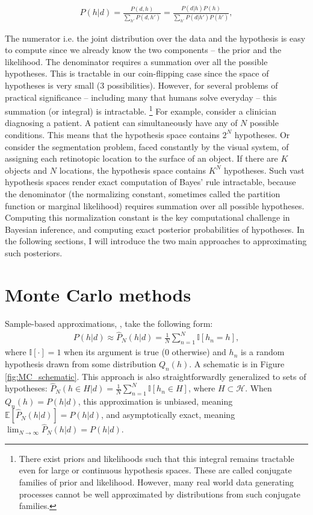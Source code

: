 \begin{align}
    P(h|d) = \frac{P(d, h)}{\sum_{h'} P(d, h')} = \frac{P(d|h)P(h)}{\sum_{h'} P(d|h') P(h')},
\end{align}

The numerator i.e. the joint distribution over the data and the hypothesis is easy to compute since we already know the two components -- the prior and the likelihood. The denominator requires a summation over all the possible hypotheses. This is tractable in our coin-flipping case since the space of hypotheses is very small (3 possibilities). However, for several problems of practical significance -- including many that humans solve everyday -- this summation (or integral) is intractable. \footnote{There exist priors and likelihoods such that this integral remains tractable even for large or continuous hypothesis spaces. These are called conjugate families of prior and likelihood. However, many real world data generating processes cannot be well approximated by distributions from such conjugate families.}  For example, consider a clinician diagnosing a patient. A patient can simultaneously have any of $N$ possible conditions. This means that the hypothesis space contains $2^N$ hypotheses. Or consider the segmentation problem, faced constantly by the visual system, of assigning each retinotopic location to the surface of an object. If there are $K$ objects and $N$ locations, the hypothesis space contains $K^N$ hypotheses. Such vast hypothesis spaces render exact computation of Bayes' rule intractable, because the denominator (the normalizing constant, sometimes called the partition function or marginal likelihood) requires summation over all possible hypotheses. Computing this normalization constant is the key computational challenge in Bayesian inference, and computing exact posterior probabilities of hypotheses. In the following sections, I will introduce the two main approaches to approximating such posteriors.

\section{Monte Carlo methods}

Sample-based approximations, \citep[also known as \emph{Monte Carlo} approximations][]{robert13}, take the following form:
\begin{align}
P(h|d) \approx \hat{P}_N(h|d) = \frac{1}{N}\sum_{n=1}^N \mathbb{I}[h_n=h],
\end{align}
where $\mathbb{I}[\cdot]=1$ when its argument is true (0 otherwise) and $h_n$ is a random hypothesis drawn from some distribution $Q_n(h)$. A schematic is in Figure \ref{fig:MC_schematic}. This approach is also straightforwardly generalized to sets of hypotheses: $\hat{P}_N(h \in H|d) = \frac{1}{N}\sum_{n=1}^N \mathbb{I}[h_n \in H]$, where $H \subset \mathcal{H}$. When $Q_n(h) = P(h|d)$, this approximation is unbiased, meaning $\mathbb{E}[\hat{P}_N(h|d)] = P(h|d)$, and asymptotically exact, meaning $\lim_{N\rightarrow \infty} \hat{P}_N(h|d) = P(h|d)$.


